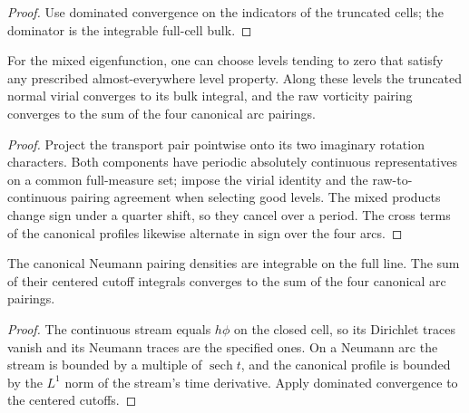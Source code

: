 \begin{proof}
\leanok
Use dominated convergence on the indicators of the truncated cells;
the dominator is the integrable full-cell bulk.
\end{proof}

\begin{lemma}
\label{lem:mixed-pairing-levels}
\leanok
For the mixed eigenfunction, one can choose levels tending to zero that
satisfy any prescribed almost-everywhere level property. Along these levels
the truncated normal virial converges to its bulk integral, and the raw
vorticity pairing converges to the sum of the four canonical arc pairings.
\end{lemma}

\begin{proof}
\leanok
Project the transport pair pointwise onto its two imaginary rotation
characters. Both components have periodic absolutely continuous
representatives on a common full-measure set; impose the virial identity
and the raw-to-continuous pairing agreement when selecting good levels.
The mixed products change sign under a quarter shift, so they cancel
over a period. The cross terms of the canonical profiles likewise
alternate in sign over the four arcs.
\end{proof}

\begin{lemma}
\label{lem:mixed-canonical-cutoff}
\leanok
The canonical Neumann pairing densities are integrable on the full
line. The sum of their centered cutoff integrals converges to the sum
of the four canonical arc pairings.
\end{lemma}

\begin{proof}
\leanok
The continuous stream equals $h\phi$ on the closed cell, so its Dirichlet
traces vanish and its Neumann traces are the specified ones. On a Neumann
arc the stream is bounded by a multiple of $\operatorname{sech}t$, and
the canonical profile is bounded by the $L^1$ norm of the stream's
time derivative. Apply dominated convergence to the centered cutoffs.
\end{proof}

